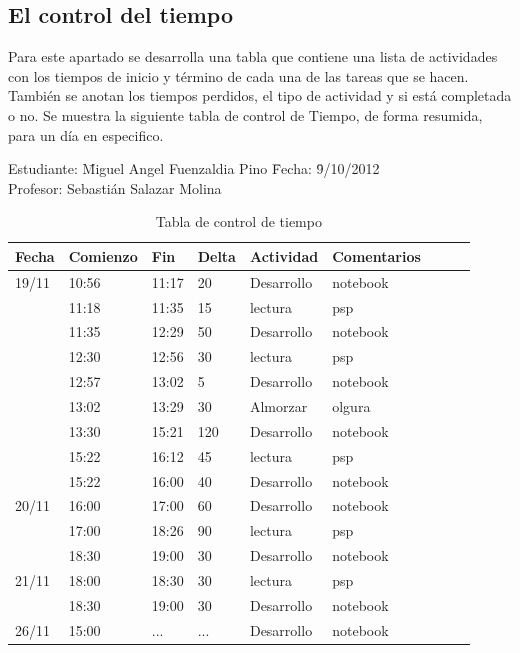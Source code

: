 \documentclass[a4paper,12pt,openany,oneside]{book}
\begin{document}
\subsection{El control del tiempo}
Para este apartado se desarrolla una tabla que contiene una lista de actividades con los tiempos de inicio y término de cada una de las tareas que se hacen. También se anotan los tiempos perdidos, el tipo de actividad y si está completada o no. Se muestra la siguiente tabla de control de Tiempo, de forma resumida, para un día en especifico.
\newpage
\begin{table}
\begin{tabbing}
Estudiante: \= Miguel Angel Fuenzaldia Pino \= Fecha: \= 9/10/2012\\
Profesor: \> Sebastián Salazar Molina \>   \>  \\
\end{tabbing}
\begin{tabular}{| l | l | l | l | l | l | l | l | l |}
\hline
\textbf{Fecha} & \textbf{Comienzo} & \textbf{Fin} & \textbf{Delta} & \textbf{Actividad} & \textbf{Comentarios}\\
\hline
19/11 & 10:56 & 11:17 & 20 & Desarrollo & notebook\\
\hline
      & 11:18 & 11:35 & 15 & lectura & psp\\
\hline
      & 11:35 & 12:29 & 50 & Desarrollo & notebook\\
\hline
      & 12:30 & 12:56 & 30 & lectura & psp\\
\hline
      & 12:57 & 13:02 & 5 & Desarrollo & notebook\\
\hline
      & 13:02 & 13:29 & 30 & Almorzar & olgura\\
\hline
      & 13:30 & 15:21 & 120 & Desarrollo & notebook\\
\hline
      & 15:22 & 16:12 & 45 & lectura & psp\\
\hline
      & 15:22 & 16:00 & 40 & Desarrollo & notebook\\
\hline   
20/11 & 16:00 & 17:00 & 60 & Desarrollo & notebook\\
\hline
      & 17:00 & 18:26 & 90 & lectura & psp\\
\hline
      & 18:30 & 19:00 & 30 & Desarrollo & notebook\\
\hline 
21/11 & 18:00 & 18:30 & 30 & lectura & psp\\
\hline
      & 18:30 & 19:00 & 30 & Desarrollo & notebook\\
\hline 
26/11 & 15:00 & ... & ... & Desarrollo & notebook\\
\hline
\end{tabular}
\caption{Tabla de control de tiempo}
\end{table}
\end{document}
